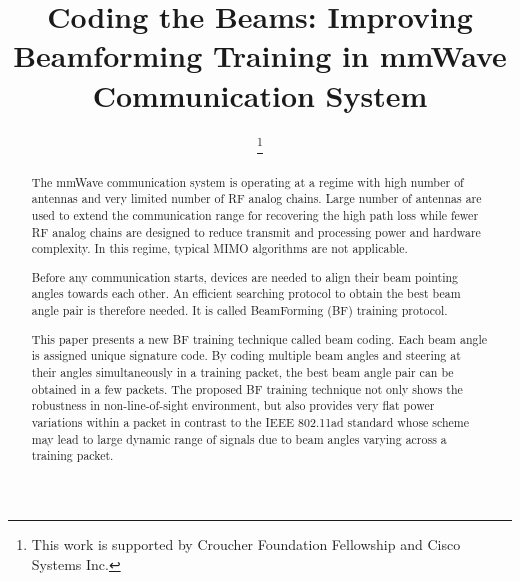 \documentclass[10pt,conference]{IEEEtran}
\begin{document}
\IEEEoverridecommandlockouts
\newtheorem{definition}{Definition}
\newtheorem{lemma}{Lemma}
\title{Coding the Beams: Improving Beamforming Training in mmWave
Communication System}


\author{
  \and
\thanks{This work is supported by Croucher Foundation Fellowship and Cisco Systems Inc.}}














\maketitle

\begin{abstract}
The mmWave communication system is operating at a regime with high number of antennas and very limited number of RF analog chains. Large number of antennas are used to extend the communication range for recovering the high path loss while fewer RF analog chains are designed to reduce transmit and processing power and hardware complexity. In this regime, typical MIMO algorithms are not applicable.

Before any communication starts, devices are needed to align their beam pointing angles towards each other. An efficient searching protocol to obtain the best beam angle pair is therefore needed. It is
called BeamForming (BF) training protocol.

This paper presents a new BF training technique
called beam coding. Each beam angle is assigned unique signature code. By
coding multiple beam angles and steering at their angles simultaneously in a
training packet, the best beam angle pair can be obtained in a few packets. The proposed BF training technique not only shows the robustness in non-line-of-sight environment, but also provides very flat power variations within a packet in contrast to the IEEE 802.11ad standard whose scheme may lead to large dynamic range of signals due to beam angles varying across a training packet.
\end{abstract}
\end{document}
